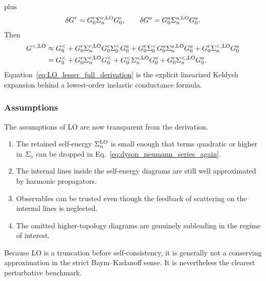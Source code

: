 plus
\begin{equation}
    \delta G^r = G_0^r\Sigma_n^{r,\rm LO}G_0^r,
    \qquad
    \delta G^a = G_0^a\Sigma_n^{a,\rm LO}G_0^a.
\end{equation}
Then
\begin{align}
    G^{<,\rm LO}
    &\approx
    G_0^<
    + G_0^r\Sigma_n^{r,\rm LO}G_0^r\Sigma_0^<G_0^a
    + G_0^r\Sigma_0^<G_0^a\Sigma_n^{a,\rm LO}G_0^a
    + G_0^r\Sigma_n^{<,\rm LO}G_0^a \\
    &=
    G_0^<
    + G_0^r\Sigma_n^{r,\rm LO}G_0^<
    + G_0^<\Sigma_n^{a,\rm LO}G_0^a
    + G_0^r\Sigma_n^{<,\rm LO}G_0^a.
    \label{eq:LO_lesser_full_derivation}
\end{align}
Equation~\eqref{eq:LO_lesser_full_derivation} is the explicit linearized Keldysh expansion behind a lowest-order inelastic conductance formula.

\subsubsection{Assumptions}
The assumptions of LO are now transparent from the derivation.
\begin{enumerate}[label=\arabic*.]
\item The retained self-energy $\Sigma_n^{\rm LO}$ is small enough that terms quadratic or higher in $\Sigma_n$ can be dropped in Eq.~\eqref{eq:dyson_neumann_series_again}.
\item The internal lines inside the self-energy diagrams are still well approximated by harmonic propagators.
\item Observables can be trusted even though the feedback of scattering on the internal lines is neglected.
\item The omitted higher-topology diagrams are genuinely subleading in the regime of interest.
\end{enumerate}
Because LO is a truncation before self-consistency, it is generally not a conserving approximation in the strict Baym--Kadanoff sense. It is nevertheless the clearest perturbative benchmark.

